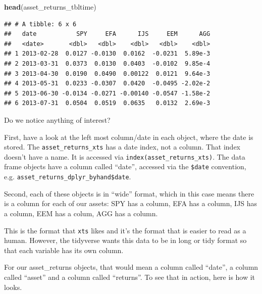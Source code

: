 \documentclass[]{krantz}
\makeatletter
\newenvironment{Shaded}{\begin{snugshade}}{\end{snugshade}}
\newcommand{\KeywordTok}[1]{\textcolor[rgb]{0.13,0.29,0.53}{\textbf{#1}}}
\newcommand{\StringTok}[1]{\textcolor[rgb]{0.31,0.60,0.02}{#1}}
\newcommand{\OperatorTok}[1]{\textcolor[rgb]{0.81,0.36,0.00}{\textbf{#1}}}
\newcommand{\NormalTok}[1]{#1}
\newenvironment{kframe}{%
\medskip{}
\setlength{\fboxsep}{.8em}
 \def\at@end@of@kframe{}%
 \ifinner\ifhmode%
  \def\at@end@of@kframe{\end{minipage}}%
  \begin{minipage}{\columnwidth}%
 \fi\fi%
 \def\FrameCommand##1{\hskip\@totalleftmargin \hskip-\fboxsep
 \colorbox{shadecolor}{##1}\hskip-\fboxsep
     \hskip-\linewidth \hskip-\@totalleftmargin \hskip\columnwidth}%
 \MakeFramed {\advance\hsize-\width
   \@totalleftmargin\z@ \linewidth\hsize
   \@setminipage}}%
 {\par\unskip\endMakeFramed%
 \at@end@of@kframe}
\renewenvironment{Shaded}{\begin{kframe}}{\end{kframe}}
\makeatother
\begin{document}
\begin{Shaded}
\begin{Highlighting}[]
\KeywordTok{head}\NormalTok{(asset_returns_tbltime)}
\end{Highlighting}
\end{Shaded}

\begin{verbatim}
## # A tibble: 6 x 6
##   date           SPY     EFA      IJS     EEM      AGG
##   <date>       <dbl>   <dbl>    <dbl>   <dbl>    <dbl>
## 1 2013-02-28  0.0127 -0.0130  0.0162  -0.0231  5.89e-3
## 2 2013-03-31  0.0373  0.0130  0.0403  -0.0102  9.85e-4
## 3 2013-04-30  0.0190  0.0490  0.00122  0.0121  9.64e-3
## 4 2013-05-31  0.0233 -0.0307  0.0420  -0.0495 -2.02e-2
## 5 2013-06-30 -0.0134 -0.0271 -0.00140 -0.0547 -1.58e-2
## 6 2013-07-31  0.0504  0.0519  0.0635   0.0132  2.69e-3
\end{verbatim}

Do we notice anything of interest?

First, have a look at the left most column/date in each object, where
the date is stored. The \texttt{asset\_returns\_xts} has a date index,
not a column. That index doesn't have a name. It is accessed via
\texttt{index(asset\_returns\_xts)}. The data frame objects have a
column called ``date'', accessed via the \texttt{\$date} convention,
e.g. \texttt{asset\_returns\_dplyr\_byhand\$date}.

Second, each of these objects is in ``wide'' format, which in this case
means there is a column for each of our assets: SPY has a column, EFA
has a column, IJS has a column, EEM has a colum, AGG has a column.

This is the format that \texttt{xts} likes and it's the format that is
easier to read as a human. However, the tidyverse wants this data to be
in long or tidy format so that each variable has its own column.

For our asset\_returns objects, that would mean a column called
``date'', a column called ``asset'' and a column called ``returns''. To
see that in action, here is how it looks.

\begin{Shaded}
\end{Shaded}
\end{document}
